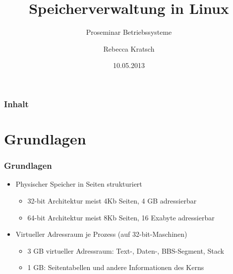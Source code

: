 \documentclass[ddcfooter,nosectionnum]{tudbeamer}
\begin{document}
\title[Speicherverwaltung in Linux]{Speicherverwaltung in Linux}
\subtitle{Proseminar Betriebssysteme}
\author{Rebecca Kratsch}

\date{10.05.2013}

\maketitle
	

\begin{frame}
    \frametitle{Inhalt}
	\tableofcontents
\end{frame}

\section{Grundlagen}
\begin{frame} 
    \frametitle{Grundlagen}
    	\begin{itemize}
			\item Physischer Speicher in Seiten strukturiert
			\begin {itemize}
				\item 32-bit Architektur meist 4Kb Seiten, 4 GB adressierbar
				\item 64-bit Architektur meist 8Kb Seiten, 16 Exabyte adressierbar
    		\end{itemize}
			\item Virtueller Adressraum je Prozess (auf 32-bit-Maschinen)
			\begin {itemize}
				\item 3 GB virtueller Adressraum: Text-, Daten-, BBS-Segment, Stack			\item 1 GB: Seitentabellen und andere Informationen des Kerns    			\end{itemize}
    \end{itemize}
    \end{frame}
\end{document}
